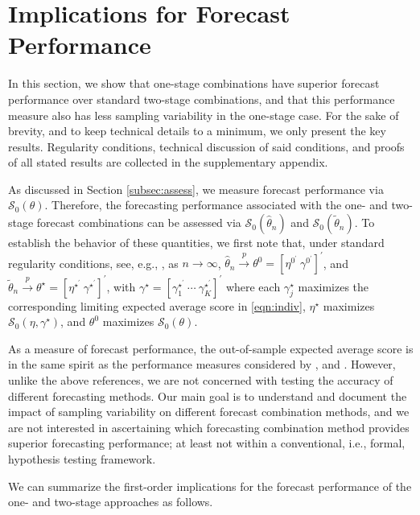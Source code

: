 \documentclass[12pt]{article}
\theoremstyle{definition}
\theoremstyle{remark}
\begin{document}
{\section{Implications for Forecast Performance\label{sec:implications}}

In this section, we show that one-stage combinations have superior forecast performance over standard two-stage combinations, and that this performance measure also has less sampling variability in the one-stage case. For the sake of brevity, and to keep technical details to a minimum, we only present the key results. Regularity conditions, technical discussion of said conditions, and proofs of all stated results are collected in the supplementary appendix.

As discussed in Section \ref{subsec:assess}, we measure forecast performance via $\mathcal{S}_{0}(\theta)$. Therefore, the forecasting performance associated with the one- and two-stage forecast combinations can be assessed via $\mathcal{S}_{0}(\hat{\theta}_{n})$ and $\mathcal{S}_{0}(\tilde{\theta}_{n})$. To establish the behavior of these quantities, we first note that, under standard regularity conditions, see, e.g., \citet{Newey1994}, as $n \rightarrow \infty $, $\hat{\theta}_{n} \overset{p}{\rightarrow} \theta^{0} = [\eta^{0^{\prime}}\ \gamma^{0^{\prime}}]^{\prime}$, and $\tilde{\theta}_{n} \overset{p}{\rightarrow} \theta^{\star} = [\eta^{\star^{\prime}}\ \gamma^{\star^{\prime}}]^{\prime}$, with $\gamma^{\star} = [\gamma_{1}^{\star^{\prime}}\ \cdots\ \gamma_{K}^{\star^{\prime}}]^{\prime}$ where each $\gamma_{j}^{\star}$ maximizes the corresponding limiting expected average score in \eqref{eqn:indiv}, $\eta^{\star}$ maximizes $\mathcal{S}_{0}(\eta, \gamma^{\star})$, and $\theta^{0}$ maximizes $\mathcal{S}_{0}(\theta)$.}

As a measure of forecast performance, the out-of-sample expected average score is in the same spirit as the performance measures considered by \cite{West1996}, \cite{Hansen2005} and \cite{Giacomini2006}. However, unlike the above references, we are not concerned with testing the accuracy of different forecasting methods. Our main goal is to understand and document the impact of sampling variability on different forecast combination methods, and we are not interested in ascertaining which forecasting combination method provides superior forecasting performance; at least not within a conventional, i.e., formal, hypothesis testing framework.

We can summarize the first-order implications for the forecast performance of the one- and two-stage approaches as follows.
\end{document}
